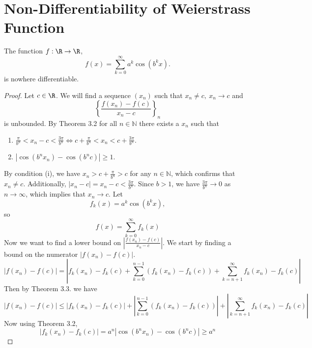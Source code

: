 \documentclass[fontsize=14pt]{scrartcl}
\begin{document}
\section{Non-Differentiability of Weierstrass Function} 
\begin{theorem} 
    The function $f: \R \to \R$,
    \begin{equation}
        f(x) = \sum_{k=0}^{\infty} a^k \cos(b^k x).
    \end{equation}
    is nowhere differentiable.
\end{theorem}
\begin{proof}
    Let $c \in \R$. We will find a sequence $(x_n)$ such that $x_n \not = c, \ x_n \to c$ and 
    \begin{equation}
        \left\{\frac{f(x_n)-f(c)}{x_n-c} \right\}_n
    \end{equation}
    is unbounded.
    By Theorem 3.2 for all $n \in \mathbb{N}$ there exists a $x_n$ such that
    \begin{enumerate}[label=(\roman*)]
        \item $\frac{\pi}{b^n} < x_n -c < \frac{3\pi}{b^n} \Leftrightarrow c + \frac{\pi}{b^n} < x_n < c +\frac{3\pi}{b^n}$.
        \item $|\cos(b^n x_n) - \cos(b^n c)| \geq 1$.
    \end{enumerate}
    By condition (i), we have $x_n > c + \frac{\pi}{b^n} > c$ for any $n \in \mathbb{N}$, which confirms that $x_n \neq c$. Additionally, $|x_n-c| = x_n-c < \frac{3\pi}{b^n}$. Since $b > 1$, we have $\frac{3\pi}{b^n} \to 0$ as $n \to \infty$, which implies that $x_n \to c$.
    Let 
    \begin{equation}
        f_k(x) = a^k\cos(b^k x),
    \end{equation}
    so
    \begin{equation*}
        f(x) = \sum_{k=0}^{\infty}f_k(x)
    \end{equation*}
    Now we want to find a lower bound on $\left| \frac{f(x_n)-f(c)}{x_n-c}\right|$. We start by finding a bound on the numerator $|f(x_n) - f(c)|$.
    \begin{equation*}
        |f(x_n) - f(c)| = \left| f_k(x_n)-f_k(c) + \sum_{k=0}^{n-1}(f_k(x_n)-f_k(c)) + \sum_{k=n+1}^{\infty}f_k(x_n)-f_k(c) \right|
    \end{equation*}
    Then by Theorem 3.3. we have 
    \begin{equation*}
        |f(x_n) - f(c)| \leq \left| f_k(x_n)-f_k(c)\right| + \left| \sum_{k=0}^{n-1}(f_k(x_n)-f_k(c))\right| + \left| \sum_{k=n+1}^{\infty}f_k(x_n)-f_k(c) \right|
    \end{equation*}
    Now using Theorem 3.2,
    \begin{equation*}
        \left| f_k(x_n)-f_k(c)\right| = a^n|\cos(b^n x_n) - \cos(b^n c)| \geq a^n
    \end{equation*}


\end{proof}
\end{document}
